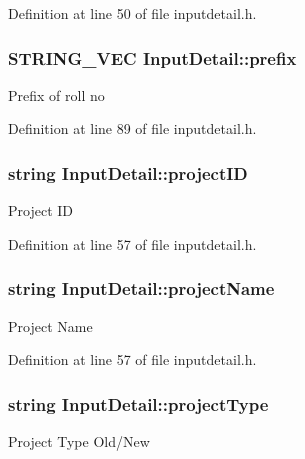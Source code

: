 Definition at line 50 of file inputdetail.\-h.

\hypertarget{classInputDetail_af81c2cdf9b1336634bbb33165921d879}{
\subsubsection[{prefix}]{\setlength{\rightskip}{0pt plus 5cm}S\-T\-R\-I\-N\-G\-\_\-\-V\-E\-C Input\-Detail\-::prefix\hspace{0.3cm}{\ttfamily [protected]}}}\label{classInputDetail_af81c2cdf9b1336634bbb33165921d879}
Prefix of roll no 

Definition at line 89 of file inputdetail.\-h.

\hypertarget{classInputDetail_a08069ee622c626c038b821ddcc7427b4}{
\subsubsection[{project\-I\-D}]{\setlength{\rightskip}{0pt plus 5cm}string Input\-Detail\-::project\-I\-D\hspace{0.3cm}{\ttfamily [protected]}}}\label{classInputDetail_a08069ee622c626c038b821ddcc7427b4}
Project I\-D 

Definition at line 57 of file inputdetail.\-h.

\hypertarget{classInputDetail_aaaf51475a2a4ddbe34e38c96bdb45bad}{
\subsubsection[{project\-Name}]{\setlength{\rightskip}{0pt plus 5cm}string Input\-Detail\-::project\-Name\hspace{0.3cm}{\ttfamily [protected]}}}\label{classInputDetail_aaaf51475a2a4ddbe34e38c96bdb45bad}
Project Name 

Definition at line 57 of file inputdetail.\-h.

\hypertarget{classInputDetail_ad2c46fdc8093eb88e01497e55b2e8e4d}{
\subsubsection[{project\-Type}]{\setlength{\rightskip}{0pt plus 5cm}string Input\-Detail\-::project\-Type\hspace{0.3cm}{\ttfamily [protected]}}}\label{classInputDetail_ad2c46fdc8093eb88e01497e55b2e8e4d}
Project Type Old/\-New 

